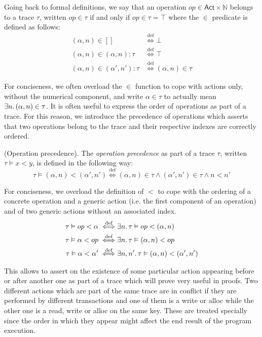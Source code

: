 Going back to formal definitions, we say that an operation $op \in \mathsf{Act} \times \mathds{N}$ belongs to a trace $\tau$, written $op \in \tau$ if and only if $op \in \tau = \top$ where the $\in$ predicate is defined as follows:
\begin{align*}
	(\alpha, n) \in [] &\overset{\text{def}}{\iff} \bot \\
	(\alpha, n) \in (\alpha, n):\tau &\overset{\text{def}}{\iff} \top \\
	(\alpha, n) \in (\alpha', n'):\tau &\overset{\text{def}}{\iff} (\alpha, n) \in \tau
\end{align*}

For conciseness, we often overload the $\in$ function to cope with actions only, without the numerical component, and write $\alpha \in \tau$ to actually mean $\exists n \ldotp (\alpha, n) \in \tau$. It is often useful to express the order of operations as part of a trace. For this reason, we introduce the precedence of operations which asserts that two operations belong to the trace and their respective indexes are correctly ordered.
\begin{defn}
	(Operation precedence).
	The \emph{operation precedence} as part of a trace $\tau$, written $\tau \vDash x < y$, is defined in the following way:
	\[
		\tau \vDash (\alpha, n) < (\alpha', n') \overset{\text{def}}{\iff}
(\alpha, n) \in \tau \land (\alpha', n') \in \tau \land n < n'
	\]
\end{defn}

For conciseness, we overload the definition of $<$ to cope with the ordering of a concrete operation and a generic action (i.e. the first component of an operation) and of two generic actions without an associated index.
\begin{align*}
	\tau \vDash op < \alpha \overset{\text{def}}{\iff}&
	\exists n \ldotp \tau \vDash op < (\alpha, n)
		\\
	\tau \vDash \alpha < op \overset{\text{def}}{\iff}&
	\exists n \ldotp \tau \vDash (\alpha, n) < op
		\\
	\tau \vDash \alpha < \alpha' \overset{\text{def}}{\iff}&
	\exists n, n' \ldotp \tau \vDash (\alpha, n) < (\alpha', n')
\end{align*}

This allows to assert on the existence of some particular action appearing before or after another one as part of a trace which will prove very useful in proofs. Two different actions which are part of the same trace are in conflict if they are performed by different transactions and one of them is a write or alloc while the other one is a read, write or alloc on the same key. These are treated specially since the order in which they appear might affect the end result of the program execution.

